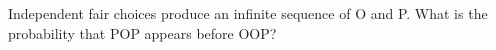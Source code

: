 Independent fair choices produce an infinite sequence of O and P. What is the probability that POP appears before OOP?
